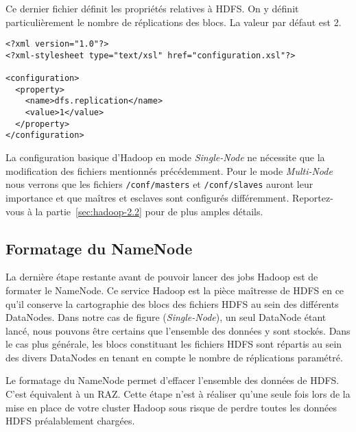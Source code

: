 \par Ce dernier fichier définit les propriétés relatives à HDFS. On y définit particulièrement le nombre de réplications des blocs. La valeur par défaut est 2.

\begin{verbatim}
<?xml version="1.0"?>
<?xml-stylesheet type="text/xsl" href="configuration.xsl"?>

<configuration>
  <property>
    <name>dfs.replication</name>
    <value>1</value>
  </property>
</configuration>
\end{verbatim}

\par La configuration basique d'Hadoop en mode \emph{Single-Node} ne nécessite que la modification des fichiers mentionnés précédemment. Pour le mode \emph{Multi-Node} nous verrons que les fichiers \texttt{/conf/masters} et \texttt{/conf/slaves} auront leur importance et que maîtres et esclaves sont configurés différemment. Reportez-vous à la partie~\ref{sec:hadoop-2.2} pour de plus amples détails.

\subsection{Formatage du NameNode}
\label{sec:format-nn}

\par La dernière étape restante avant de pouvoir lancer des jobs Hadoop est de formater le NameNode. Ce service Hadoop est la pièce maîtresse de HDFS en ce qu'il conserve la cartographie des blocs des fichiers HDFS au sein des différents DataNodes. Dans notre cas de figure (\emph{Single-Node}), un seul DataNode étant lancé, nous pouvons être certains que l'ensemble des données y sont stockés. Dans le cas plus générale, les blocs constituant les fichiers HDFS sont répartis au sein des divers DataNodes en tenant en compte le nombre de réplications paramétré.

\par Le formatage du NameNode permet d'effacer l'ensemble des données de HDFS. C'est équivalent à un RAZ. Cette étape n'est à réaliser qu'une seule fois lors de la mise en place de votre cluster Hadoop sous risque de perdre toutes les données HDFS préalablement chargées.

